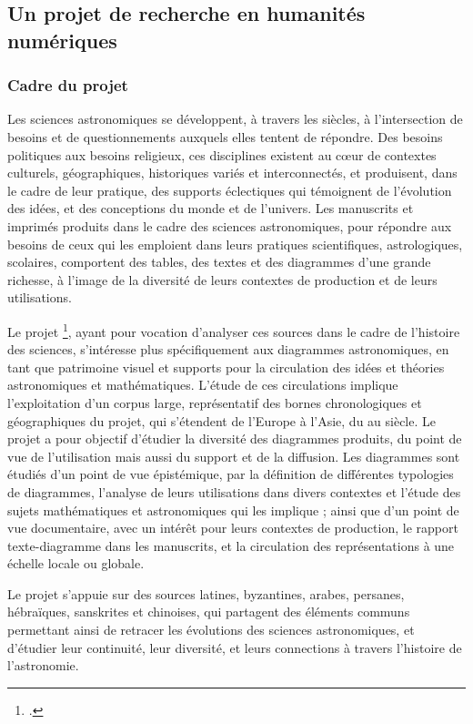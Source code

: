 
\subsection{Un projet de recherche en humanités numériques}
    \subsubsection{Cadre du projet}
	Les sciences astronomiques se développent, à travers les siècles, à l’intersection de besoins et de questionnements auxquels elles tentent de répondre. Des besoins politiques aux besoins religieux, ces disciplines existent au cœur de contextes culturels, géographiques, historiques variés et interconnectés, et produisent, dans le cadre de leur pratique, des supports éclectiques qui témoignent de l'évolution des idées, et des conceptions du monde et de l'univers. Les manuscrits et imprimés produits dans le cadre des sciences astronomiques, pour répondre aux besoins de ceux qui les emploient dans leurs pratiques scientifiques, astrologiques, scolaires, comportent des tables, des textes et des diagrammes d’une grande richesse, à l’image de la diversité de leurs contextes de production et de leurs utilisations. 
	
	Le projet \eida\footcite{EdIterAnalyserDiagrammes}, ayant pour vocation d'analyser ces sources dans le cadre de l'histoire des sciences, s’intéresse plus spécifiquement aux diagrammes astronomiques, en tant que patrimoine visuel et supports pour la circulation des idées et théories astronomiques et mathématiques. L’étude de ces circulations implique l’exploitation d’un corpus large, représentatif des bornes chronologiques et géographiques du projet, qui s’étendent de l’Europe à l’Asie, du \viii au \xviii siècle. Le projet \eida a pour objectif d’étudier la diversité des diagrammes produits, du point de vue de l’utilisation mais aussi du support et de la diffusion. Les diagrammes sont étudiés d’un point de vue épistémique, par la définition de différentes typologies de diagrammes, l’analyse de leurs utilisations dans divers contextes et l’étude des sujets mathématiques et astronomiques qui les implique ; ainsi que d’un point de vue documentaire, avec un intérêt pour leurs contextes de production, le rapport texte-diagramme dans les manuscrits, et la circulation des représentations à une échelle locale ou globale. 
	
	Le projet s’appuie sur des sources latines, byzantines, arabes, persanes, hébraïques, sanskrites et chinoises, qui partagent des éléments communs permettant ainsi de retracer les évolutions des sciences astronomiques, et d’étudier leur continuité, leur diversité, et leurs connections à travers l’histoire de l’astronomie.


